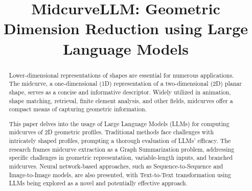 \documentclass[10pt, conference]{IEEEtran}
\begin{document}

\title{MidcurveLLM: Geometric Dimension Reduction using Large Language Models}

\author{
}

\maketitle

\begin{abstract}
Lower-dimensional representations of shapes are essential for numerous applications. The midcurve, a one-dimensional (1D) representation of a two-dimensional (2D) planar shape, serves as a concise and informative descriptor. Widely utilized in animation, shape matching, retrieval, finite element analysis, and other fields, midcurves offer a compact means of capturing geometric information.

This paper delves into the usage of Large Language Models (LLMs) for computing midcurves of 2D geometric profiles. Traditional methods face challenges with intricately shaped profiles, prompting a thorough evaluation of LLMs' efficacy. The research frames midcurve extraction as a Graph Summarization problem, addressing specific challenges in geometric representation, variable-length inputs, and branched midcurves. Neural network-based approaches, such as Sequence-to-Sequence and Image-to-Image models, are also presented, with Text-to-Text transformation using LLMs being explored as a novel and potentially effective approach. 
\end{abstract}



\end{document}
